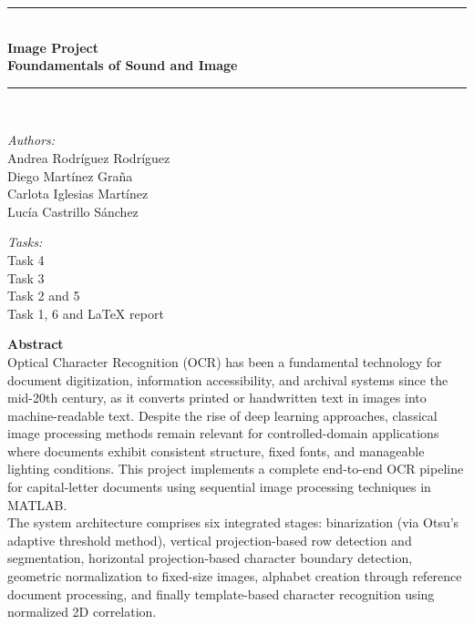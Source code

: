 \thispagestyle{empty}
\begin{center}														
\newcommand{\HRule}{\rule{\linewidth}{0.5mm}} %


																
\HRule \\[0.5cm]
{ \Huge \textrm \textbf{Image Project }}\\[1cm]
{ \huge \textrm \textbf{Foundamentals of Sound and Image } }\\[0.5cm] 													
\HRule \\[13.5cm]																

\begin{minipage}{0.46\textwidth}
	\begin{flushleft} \large
		\emph{Authors:}\\	
		Andrea Rodríguez Rodríguez\\
        Diego Martínez Graña\\
        Carlota Iglesias Martínez\\
        Lucía Castrillo Sánchez
	\end{flushleft}																
\end{minipage}		
\begin{minipage}{0.52\textwidth}		
\vspace{-0.6cm}
	\begin{flushright} \large	
		\emph{Tasks:} \\														
		Task 4 \\
		Task 3 \\
		Task 2 and 5 \\
		Task 1, 6 and LaTeX report
	\end{flushright}															
\end{minipage}								 																									
\end{center}

\newpage
{}

\textbf{\Huge Abstract} 
\\
\linebreak
\indent Optical Character Recognition (OCR) has been a fundamental technology for document digitization, information accessibility, and archival systems since the mid-20th century, as it  converts printed or handwritten text in images into machine-readable text. Despite the rise of deep learning approaches, classical image processing methods remain relevant for controlled-domain applications where documents exhibit consistent structure, fixed fonts, and manageable lighting conditions. This project implements a complete end-to-end OCR pipeline for capital-letter documents using sequential image processing techniques in MATLAB.\\

The system architecture comprises six integrated stages: binarization (via Otsu's adaptive threshold method), vertical projection-based row detection and segmentation, horizontal projection-based character boundary detection, geometric normalization to fixed-size images, alphabet creation through reference document processing, and finally template-based character recognition using normalized 2D correlation.
\newpage
\tableofcontents
\newpage